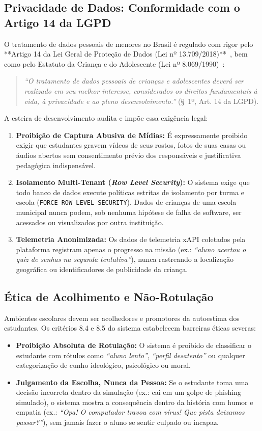 \documentclass[11pt,a4paper]{article}
\begin{document}
\subsection{Privacidade de Dados: Conformidade com o Artigo 14 da LGPD}
O tratamento de dados pessoais de menores no Brasil é regulado com rigor pelo **Artigo 14 da Lei Geral de Proteção de Dados (Lei nº 13.709/2018)**~\cite{brasil2018lgpd}, bem como pelo Estatuto da Criança e do Adolescente (Lei nº 8.069/1990)~\cite{brasil1990eca}:
\begin{quote}
  \textit{``O tratamento de dados pessoais de crianças e adolescentes deverá ser realizado em seu melhor interesse, considerados os direitos fundamentais à vida, à privacidade e ao pleno desenvolvimento.''} (\S\ 1º, Art. 14 da LGPD).
\end{quote}

A esteira de desenvolvimento audita e impõe essa exigência legal:
\begin{enumerate}
  \item \textbf{Proibição de Captura Abusiva de Mídias:} É expressamente proibido exigir que estudantes gravem vídeos de seus rostos, fotos de suas casas ou áudios abertos sem consentimento prévio dos responsáveis e justificativa pedagógica indispensável.
  \item \textbf{Isolamento Multi-Tenant (\textit{Row Level Security}):} O sistema exige que todo banco de dados execute políticas estritas de isolamento por turma e escola (\texttt{FORCE ROW LEVEL SECURITY}). Dados de crianças de uma escola municipal nunca podem, sob nenhuma hipótese de falha de software, ser acessados ou visualizados por outra instituição.
  \item \textbf{Telemetria Anonimizada:} Os dados de telemetria xAPI coletados pela plataforma registram apenas o progresso na missão (ex.: \textit{``aluno acertou o quiz de senhas na segunda tentativa''}), nunca rastreando a localização geográfica ou identificadores de publicidade da criança.
\end{enumerate}

\subsection{Ética de Acolhimento e Não-Rotulação}
Ambientes escolares devem ser acolhedores e promotores da autoestima dos estudantes. Os critérios 8.4 e 8.5 do sistema estabelecem barreiras éticas severas:
\begin{itemize}
  \item \textbf{Proibição Absoluta de Rotulação:} O sistema é proibido de classificar o estudante com rótulos como \textit{``aluno lento''}, \textit{``perfil desatento''} ou qualquer categorização de cunho ideológico, psicológico ou moral.
  \item \textbf{Julgamento da Escolha, Nunca da Pessoa:} Se o estudante toma uma decisão incorreta dentro da simulação (ex.: cai em um golpe de phishing simulado), o sistema mostra a consequência dentro da história com humor e empatia (ex.: \textit{``Opa! O computador travou com vírus! Que pista deixamos passar?''}), sem jamais fazer o aluno se sentir culpado ou incapaz.
\end{itemize}
\end{document}
